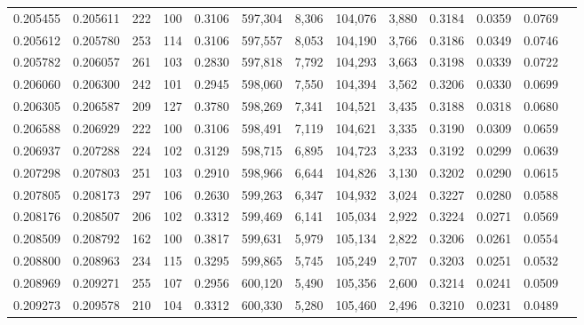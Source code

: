 \begin{tabular}{rrrrrrrrrrrrr}
0.205455 & 0.205611 &   222 & 100 &                                     0.3106 & 597,304 &   8,306 & 104,076 &   3,880 & 0.3184 & 0.0359 & 0.0769 \\
0.205612 & 0.205780 &   253 & 114 &                                     0.3106 & 597,557 &   8,053 & 104,190 &   3,766 & 0.3186 & 0.0349 & 0.0746 \\
0.205782 & 0.206057 &   261 & 103 &                                     0.2830 & 597,818 &   7,792 & 104,293 &   3,663 & 0.3198 & 0.0339 & 0.0722 \\
0.206060 & 0.206300 &   242 & 101 &                                     0.2945 & 598,060 &   7,550 & 104,394 &   3,562 & 0.3206 & 0.0330 & 0.0699 \\
0.206305 & 0.206587 &   209 & 127 &                                     0.3780 & 598,269 &   7,341 & 104,521 &   3,435 & 0.3188 & 0.0318 & 0.0680 \\
0.206588 & 0.206929 &   222 & 100 &                                     0.3106 & 598,491 &   7,119 & 104,621 &   3,335 & 0.3190 & 0.0309 & 0.0659 \\
0.206937 & 0.207288 &   224 & 102 &                                     0.3129 & 598,715 &   6,895 & 104,723 &   3,233 & 0.3192 & 0.0299 & 0.0639 \\
0.207298 & 0.207803 &   251 & 103 &                                     0.2910 & 598,966 &   6,644 & 104,826 &   3,130 & 0.3202 & 0.0290 & 0.0615 \\
0.207805 & 0.208173 &   297 & 106 &                                     0.2630 & 599,263 &   6,347 & 104,932 &   3,024 & 0.3227 & 0.0280 & 0.0588 \\
0.208176 & 0.208507 &   206 & 102 &                                     0.3312 & 599,469 &   6,141 & 105,034 &   2,922 & 0.3224 & 0.0271 & 0.0569 \\
0.208509 & 0.208792 &   162 & 100 &                                     0.3817 & 599,631 &   5,979 & 105,134 &   2,822 & 0.3206 & 0.0261 & 0.0554 \\
0.208800 & 0.208963 &   234 & 115 &                                     0.3295 & 599,865 &   5,745 & 105,249 &   2,707 & 0.3203 & 0.0251 & 0.0532 \\
0.208969 & 0.209271 &   255 & 107 &                                     0.2956 & 600,120 &   5,490 & 105,356 &   2,600 & 0.3214 & 0.0241 & 0.0509 \\
0.209273 & 0.209578 &   210 & 104 &                                     0.3312 & 600,330 &   5,280 & 105,460 &   2,496 & 0.3210 & 0.0231 & 0.0489 \\

\end{tabular}

